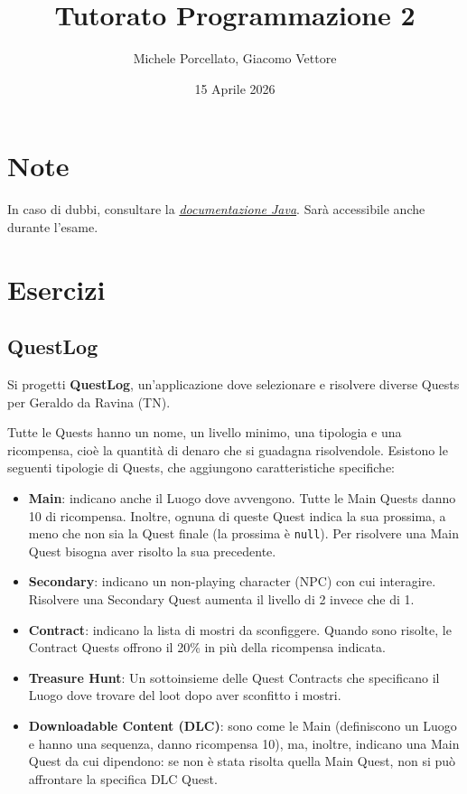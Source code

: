 \documentclass[a4paper,12pt]{article}
\title{Tutorato Programmazione 2}
\author{Michele Porcellato, Giacomo Vettore}
\date{15 Aprile 2026}
\begin{document}
\maketitle

\section{Note}
In caso di dubbi, consultare la \href{https://docs.oracle.com/en/java/javase/25/docs/api/index.html}{\textit{documentazione Java}}. Sarà accessibile anche durante l'esame.

\section{Esercizi}

\subsection{QuestLog}
Si progetti \textbf{QuestLog}, un'applicazione dove selezionare e risolvere diverse Quests per Geraldo da Ravina (TN).

Tutte le Quests hanno un nome, un livello minimo, una tipologia e una ricompensa, cioè la quantità di denaro che si guadagna risolvendole. Esistono le seguenti tipologie di Quests, che aggiungono caratteristiche specifiche:

\begin{itemize}
    \item \textbf{Main}: indicano anche il Luogo dove avvengono. Tutte le Main Quests danno 10 di ricompensa. Inoltre, ognuna di queste Quest indica la sua prossima, a meno che non sia la Quest finale (la prossima è \texttt{null}). Per risolvere una Main Quest bisogna aver risolto la sua precedente.
    \item \textbf{Secondary}: indicano un non-playing character (NPC) con cui interagire.
    Risolvere una Secondary Quest aumenta il livello di 2 invece che di 1. 
    \item \textbf{Contract}: indicano la lista di mostri da sconfiggere. Quando sono risolte, le Contract Quests offrono il 20\% in più della ricompensa indicata. 
    \item \textbf{Treasure Hunt}: Un sottoinsieme delle Quest Contracts che specificano il Luogo dove trovare del loot dopo aver sconfitto i mostri.
    \item \textbf{Downloadable Content (DLC)}: sono come le Main (definiscono un Luogo e hanno una sequenza, danno ricompensa 10), ma, inoltre, indicano una Main Quest da cui dipendono: se non è stata risolta quella Main Quest, non si può affrontare la specifica DLC Quest. 
\end{itemize}
\end{document}
